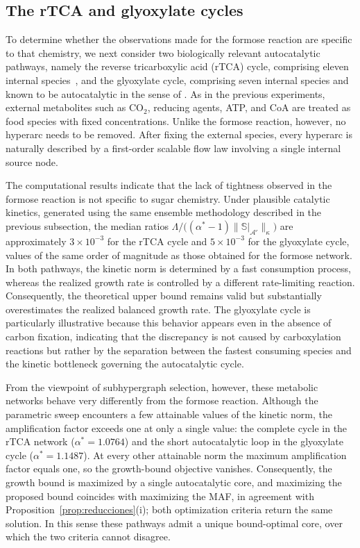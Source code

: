 \documentclass[a4paper,11pt,reqno]{amsart}
\begin{document}
\subsection{The rTCA and glyoxylate cycles}
\label{sec:carbono}

To determine whether the observations made for the formose reaction are
specific to that chemistry, we next consider two biologically relevant
autocatalytic pathways, 
namely the reverse tricarboxylic acid (rTCA) cycle, comprising eleven internal
species~\citep{smith2004universality}, and the glyoxylate cycle, comprising
seven internal species and known to be autocatalytic in the sense of
\cite{barenholz2017autocatalytic}. As in the previous experiments, external
metabolites such as $\mathrm{CO_2}$, reducing agents, ATP, and CoA are treated
as food species with fixed concentrations. Unlike the formose reaction, however,
no hyperarc needs to be removed. After fixing the external species, every
hyperarc is naturally described by a first-order scalable flow law involving a
single internal source node.

The computational results indicate that the lack of tightness observed in the
formose reaction is not specific to sugar chemistry. Under plausible catalytic
kinetics, generated using the same ensemble methodology described in the
previous subsection, the median ratios
$\Lambda/\bigl((\alpha^*-1)\|\mathbb S|_{\mathcal A'}\|_{\kappa}\bigr)$
are approximately $3\times10^{-3}$ for the rTCA cycle and
$5\times10^{-3}$ for the glyoxylate cycle, values of the same order of
magnitude as those obtained for the formose network. In both pathways, the
kinetic norm is determined by a fast consumption process, whereas the realized
growth rate is controlled by a different rate-limiting reaction. Consequently,
the theoretical upper bound remains valid but substantially overestimates the
realized balanced growth rate. The glyoxylate cycle is particularly
illustrative because this behavior appears even in the absence of carbon
fixation, indicating that the discrepancy is not caused by carboxylation
reactions but rather by the separation between the fastest consuming species and
the kinetic bottleneck governing the autocatalytic cycle.

From the viewpoint of subhypergraph selection, however, these metabolic
networks behave very differently from the formose reaction. Although the
parametric sweep encounters a few attainable values of the kinetic norm, the
amplification factor exceeds one at only a single value: the complete cycle in
the rTCA network ($\alpha^*=1.0764$) and the short autocatalytic loop in the
glyoxylate cycle ($\alpha^*=1.1487$). At every other attainable norm the
maximum amplification factor equals one, so the growth-bound objective
vanishes. Consequently, the growth bound is maximized by a single
autocatalytic core, and maximizing the proposed bound coincides with
maximizing the MAF, in agreement with Proposition~\ref{prop:reducciones}(i);
both optimization criteria return the same solution. In this sense these
pathways admit a unique bound-optimal core, over which the two criteria cannot
disagree.
\end{document}
